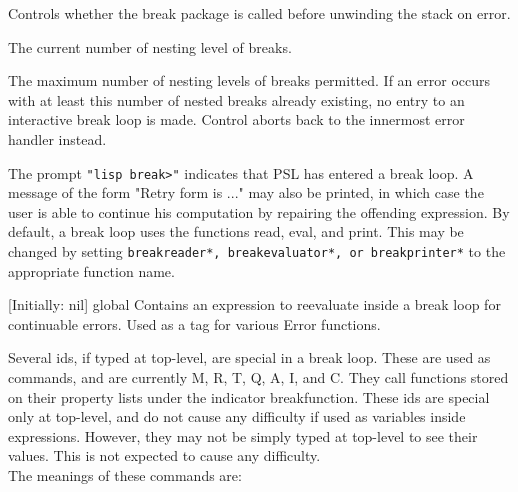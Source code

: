 {
    Controls  whether  the    break  package  is   called before
    unwinding the stack on error.
}

{
    The current number of nesting level of breaks.
}

{
    The maximum number of nesting levels  of  breaks  permitted.
    If  an  error  occurs  with  at  least this number of nested
    breaks already existing, no entry to  an  interactive  break
    loop  is  made.   Control aborts back to the innermost error
    handler instead.
}

\vspace{1cm}
The prompt {\tt "lisp break>"} indicates that PSL  has entered a break
loop.   A  message  of  the form "Retry form is ..." may also be
printed, in  which  case  the  user  is  able  to  continue  his
computation  by repairing the offending expression.  By default,
a break loop uses the functions read, eval, and print.  This may
be  changed  by  setting  {\tt breakreader*, breakevaluator*, or
breakprinter*} to the appropriate function name.

\vspace{1cm}
 {[Initially: nil]} {global}
{
    Contains  an   expression to reevaluate inside  a break loop
    for continuable errors.  Used as a  tag  for  various  Error
    functions.
}

\vspace{1cm}  
  Several  ids,  if  typed  at top-level, are special in a break
loop.  These are used as commands, and  are currently M,  R,  T,
Q,  A,  I,  and C.  They call functions stored on their property
lists under the indicator breakfunction.  These ids are  special
only  at   top-level, and  do not  cause  any difficulty if used
as variables inside expressions.    However,  they  may  not  be
simply   typed at top-level  to see their  values.  This is  not
expected to cause any difficulty.\\

The meanings of these commands are:\\

